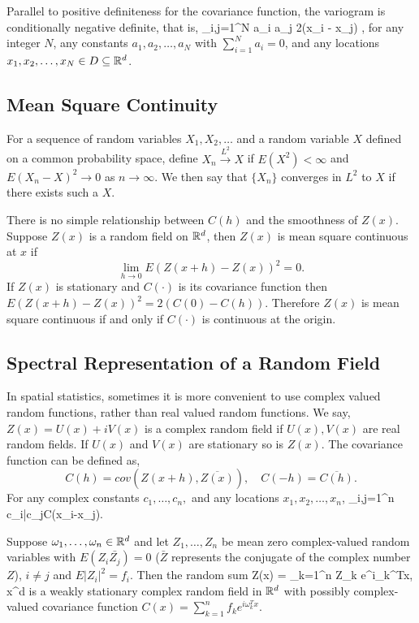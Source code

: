 Parallel to positive definiteness for the covariance function, the variogram is conditionally negative definite, that is,
\beq
\sum_{i,j=1}^{N} a_i a_j 2\gamma(x_i - x_j) ,
\eeq
for any integer $N$, any constants $a_1, a_2, \ldots, a_N$ with $\sum_{i=1}^N a_i = 0$, and any locations $x_1, x_2, \ldots, x_N \in D \subseteq \mathbb{R}^d$.


\subsection{Mean Square Continuity}

For a sequence of random variables $X_1, X_2,\ldots$ and a random variable $X$ defined on a common probability space, define $X_n\overset{L^2}\to X$ if $E(X^2)<\infty$ and $E(X_n - X)^2\to 0$ as $n \rightarrow \infty$. We then say that $\{X_n\}$ converges in $L^2$ to $X$ if there exists such a $X$.

There is no simple relationship between $C(h)$ and the smoothness of $Z(x)$. Suppose $Z(x)$ is a random field on $\mathbb{R}^d$, then $Z(x)$ is mean square continuous at $x$ if
\[
\lim_{h\to 0} E(Z(x+h)-Z(x))^2 =0.
\]
If $Z(x)$ is stationary and $C(\cdot)$ is its covariance function then $E(Z(x+h)-Z(x))^2=2(C(0)-C(h))$. Therefore $Z(x)$ is mean square continuous if and only if $C(\cdot)$ is continuous at the origin.

\subsection{Spectral Representation of a Random Field}
In spatial statistics, sometimes it is more convenient to use complex valued random functions, rather than real valued random functions. We say, $Z(x)=U(x) + i V(x)$ is a complex random field if $U(x),V(x)$ are real random fields. If $U(x)$ and $V(x)$ are stationary so is $Z(x)$. The covariance function can be defined as,
\[
	C(h) = cov(Z(x+h), \overline{Z(x)}), \quad C(-h)=\overline{C(h)}.
\]
For any complex constants $c_1,\ldots, c_n,$ and any locations $x_1, x_2, \ldots, x_n$,
\beq
\sum_{i,j=1}^n c_i\bar{c_j}C(x_i-x_j).
\eeq

Suppose $\omega_1,\ldots, \omega_n \in \mathbb{R}^d$ and let $Z_1, \ldots, Z_n$ be mean zero complex-valued random variables with  $E(Z_i\bar{Z_j})=0$  ($\bar{Z}$ represents the conjugate of the complex number $Z$), $i\ne j$ and  $E|Z_i|^2=f_i$. Then the random sum
\beq
Z(x) = \sum_{k=1}^n Z_k e^{i\omega_k^Tx}, \quad x\in\R^d
\eeq
is a weakly stationary complex random field in $\mathbb{R}^d$ with possibly complex-valued covariance function $C(x) = \sum_{k=1}^n f_k e^{i\omega_k^Tx}$. \\


